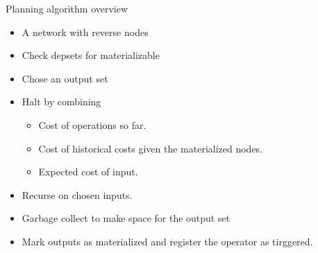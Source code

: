 \begin{frame}{Planning algorithm overview}
  \begin{itemize}
  \item A network with reverse nodes
  \item Check depsets for materializable
  \item Chose an output set
  \item Halt by combining
    \begin{itemize}
    \item Cost of operations so far.
    \item Cost of historical costs given the materialized nodes.
    \item Expected cost of input.
    \end{itemize}
  \item Recurse on chosen inputs.
  \item Garbage collect to make space for the output set
  \item Mark outputs as materialized and register the operator as tirggered.
  \end{itemize}
\end{frame}

\newcommand\planner[9]{
  \begin{tikzdiagram_h}
    \tikzset{node distance=2cm};
    \tikzset{nnode/.style={ellipse,draw}};
    \tikzset{tnode/.style={rectangle,draw}};

    \node[nnode] (a) [fill=#1] {A};
    \node[nnode] (b) [right of=a,fill=#2] {B};
    \node[nnode] (c) [right of=b,fill=#3] {C};
    \node[tnode] (to1) [below of = b] {};
    \path (to1) edge (a);
    \path (to1) edge (b);
    \path (to1) edge (c);
    \node[nnode] (d) [below left of = to1,fill=#4] {X};
    \node[nnode] (e) [below right of = to1,fill=#5] {E};
    \path (to1) edge (e);
    \path (to1) edge (d);

    \node[tnode] (to2) [above left of = d] {};
    \node[nnode] (f) [above left of = to2,fill=#6] {F};
    \node[nnode] (g) [below left of = to2,fill=#7] {G};
    \path (to2) edge (d);
    \path (to2) edge (f);
    \path (to2) edge (g);

    \node[tnode] (tu1) [below of = d] {};
    \node[nnode] (h) [below left of = tu1,fill=#8] {H};
    \node[nnode] (i) [below right of = tu1,fill=#9] {I};
    \path (tu1) edge (d);
    \path (tu1) edge (h);
    \path (tu1) edge (i);
  \end{tikzdiagram_h}
}

\renewcommand\n{none}
\newcommand\g{green!30}
\newcommand\dg{green}
\renewcommand\o{gray!30}
\newcommand\oo{gray!20}
\newcommand\inputsetsmsg{For each (materializable) input set}

